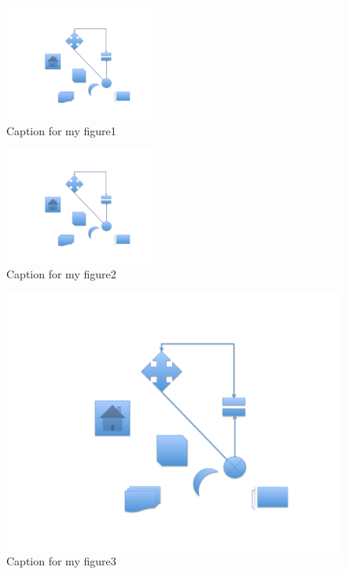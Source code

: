\begin{figure}[h]
\centering 
\includegraphics[height=1.5in]{./pics/short}
\caption{Caption for my figure1}
\label{fig:MyFigure1}
\end{figure}

\begin{figure}[h]
\centering 
\includegraphics[height=1.5in]{./pics/small}
\caption{Caption for my figure2}
\label{fig:MyFigure2}
\end{figure}

\clearpage

\begin{figure}[h]
\centering 
\includegraphics[width=6in]{./pics/my_figure}
\caption{Caption for my figure3}
\label{fig:MyFigure3}
\end{figure}






